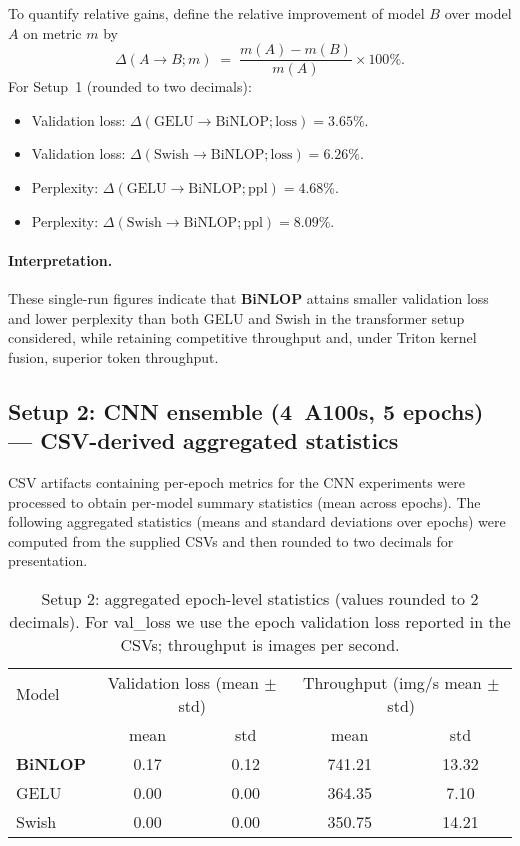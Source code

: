\documentclass[11pt, twoside, openright, english]{article}
\numberwithin{equation}{section}
\theoremstyle{plain}
\theoremstyle{definition}
\theoremstyle{remark}
\begin{document}
To quantify relative gains, define the relative improvement of model $B$ over model $A$ on metric $m$ by
\[
\Delta(A\!\to\!B; m) \;=\; \frac{m(A)-m(B)}{m(A)} \times 100\%.
\]
For Setup~1 (rounded to two decimals):
\begin{itemize}
  \item Validation loss: $\Delta(\mathrm{GELU}\!\to\!\mathrm{BiNLOP};\mathrm{loss}) = 3.65\%$.
  \item Validation loss: $\Delta(\mathrm{Swish}\!\to\!\mathrm{BiNLOP};\mathrm{loss}) = 6.26\%$.
  \item Perplexity: $\Delta(\mathrm{GELU}\!\to\!\mathrm{BiNLOP};\mathrm{ppl}) = 4.68\%$.
  \item Perplexity: $\Delta(\mathrm{Swish}\!\to\!\mathrm{BiNLOP};\mathrm{ppl}) = 8.09\%$.
\end{itemize}

\paragraph{Interpretation.} These single-run figures indicate that \textbf{BiNLOP} attains smaller validation loss and lower perplexity than both GELU and Swish in the transformer setup considered, while retaining competitive throughput and, under Triton kernel fusion, superior token throughput.

\subsection{Setup 2: CNN ensemble (4~A100s, 5 epochs) --- CSV-derived aggregated statistics}
CSV artifacts containing per-epoch metrics for the CNN experiments were processed to obtain per-model summary statistics (mean across epochs). The following aggregated statistics (means and standard deviations over epochs) were computed from the supplied CSVs and then rounded to two decimals for presentation.

\begin{table}[H]
\centering
\caption{Setup 2: aggregated epoch-level statistics (values rounded to 2 decimals). For val\_loss we use the epoch validation loss reported in the CSVs; throughput is images per second.}
\label{tab:setup2-results}
\begin{tabular}{lcccc}
\toprule
Model & \multicolumn{2}{c}{Validation loss (mean $\pm$ std)} & \multicolumn{2}{c}{Throughput (img/s mean $\pm$ std)} \\
\cmidrule(lr){2-3}\cmidrule(lr){4-5}
 & mean & std & mean & std \\
\midrule
\textbf{BiNLOP} & 0.17 & 0.12 & 741.21 & 13.32 \\
GELU          & 0.00 & 0.00 & 364.35 & 7.10 \\
Swish         & 0.00 & 0.00 & 350.75 & 14.21 \\
\bottomrule
\end{tabular}
\end{table}
\end{document}
